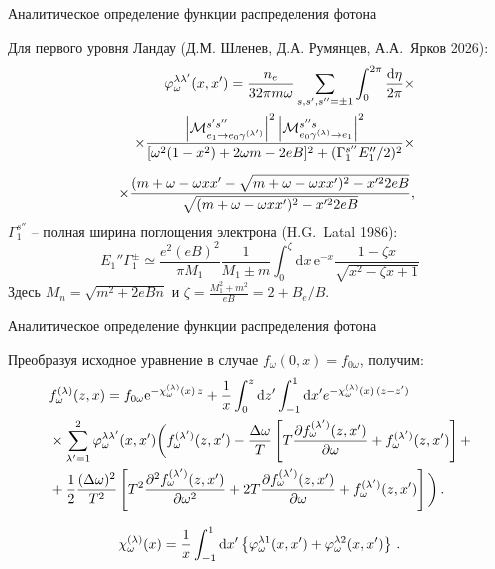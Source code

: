 \documentclass{beamer}
\newcommand{\dd}{\mathrm{d}}
\newcommand{\eee}{\mathrm{e}}
\begin{document}
\begin{frame}
	{ \small Аналитическое определение функции распределения фотона}
	
	{\fontsize{8}{10}\selectfont
	Для первого уровня Ландау (Д.М. Шленев, Д.А. Румянцев, А.А.~Ярков 2026):}
	\begin{equation}\nonumber
	\begin{aligned}
	&&\varphi^{\lambda\lambda'}_\omega(x,x') = \frac{n_e}{32 \pi m \omega} \sum_{s,s',s''=\pm 1}\int_{0}^{2\pi}\frac{\dd\eta}{2\pi}\times
	\\
	&&\times\frac{\left|{\cal M}^{s's''}_{e_1\to e_0\gamma^{(\lambda')}}\right|^2\left|{\cal M}^{s''s}_{e_0\gamma^{(\lambda)}\to e_1 }\right|^2}{[\omega^2(1-x^2)+2\omega m - 2eB]^2 + (\Gamma_1^{s''}E_1''/2)^2}\times
	\\[2mm]
	&&\times \frac{(m+\omega - \omega x x'-\sqrt{m+\omega - \omega x x')^2 - x'^2 2eB}}{\sqrt{(m+\omega - \omega x x')^2 - x'^2 2eB}},
	\end{aligned}
	\end{equation}
	 $\Gamma_1^{s''}$ -- полная ширина поглощения электрона (H.G.~Latal 1986):
	\begin{equation}\nonumber
	E_1''\Gamma_1^{\pm} \simeq \frac{e^2 (eB)^2}{\pi M_1}\frac{1}{M_1\pm m} \int_{0}^{\zeta}\dd x\, \eee^{-x} \frac{1-\zeta x}{\sqrt{x^2-\zeta x+1}}
	\end{equation}
	Здесь $M_n=\sqrt{m^2+2 eBn}$ и $\zeta=\frac{M_1^2+m^2}{eB}=2+B_e/B$.
\end{frame}
\begin{frame}{ \small Аналитическое определение функции распределения фотона}
	
	Преобразуя исходное уравнение в случае $f_\omega(0,x)=f_{0\omega}$, получим:
	\begin{equation}\label{FormSol}\nonumber
	\begin{aligned}
	&f_\omega^{(\lambda)}(z,x)=f_{0\omega} 	\eee^{-{\cal \chi}_\omega^{(\lambda)}(x)\, z} + \frac{1}{x}\int_{0}^{z}\dd z'\int_{-1}^{1}\dd x' e^{-{\cal \chi}_\omega^{(\lambda)}(x)\, (z-z')}\,
	\\
	&\times \sum_{\lambda'=1}^2\varphi_\omega^{\lambda 	\lambda'}(x,x')\bigg(f_\omega^{(\lambda')}(z,x')- \frac{\Delta \omega}{T}
	\left[
	T \frac{\partial f_\omega^{(\lambda')}(z,x')}{\partial \omega} + f_\omega^{(\lambda')}(z,x')
	\right]+
	\\
	&+ \frac{1}{2}\frac{(\Delta \omega)^2}{T^2}
	\left[
	T^2 \frac{\partial^2 f_\omega^{(\lambda')}(z,x')}{\partial \omega^2} + 2T \frac{\partial f_\omega^{(\lambda')}(z,x')}{\partial \omega}+f_\omega^{(\lambda')}(z,x')
	\right]\bigg)\, .
	\end{aligned}	
	\end{equation}
	
	\begin{equation}\nonumber
	{\cal \chi}_\omega^{(\lambda)}(x) = \frac{1}{x} \int_{-1}^{1} \dd x' \left\{\varphi^{\lambda 1}_\omega(x,x')+\varphi^{\lambda 2}_\omega(x,x')\right\}\, .
	\end{equation}
\end{frame}
\end{document}
